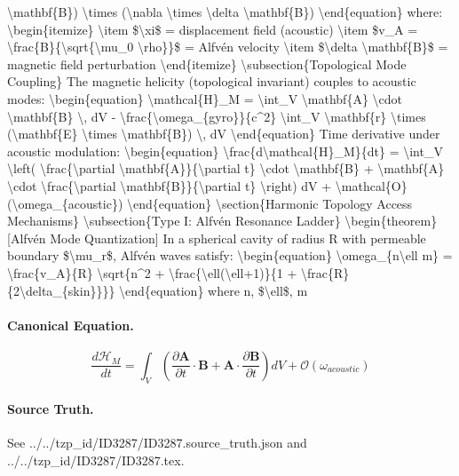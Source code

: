 \textbackslash{}mathbf\{B\}) \textbackslash{}times (\textbackslash{}nabla \textbackslash{}times \textbackslash{}delta \textbackslash{}mathbf\{B\}) \textbackslash{}end\{equation\} where: \textbackslash{}begin\{itemize\} \textbackslash{}item \$\textbackslash{}xi\$ = displacement field (acoustic) \textbackslash{}item \$v\_A = \textbackslash{}frac\{B\}\{\textbackslash{}sqrt\{\textbackslash{}mu\_0 \textbackslash{}rho\}\}\$ = Alfvén velocity \textbackslash{}item \$\textbackslash{}delta \textbackslash{}mathbf\{B\}\$ = magnetic field perturbation \textbackslash{}end\{itemize\} \textbackslash{}subsection\{Topological Mode Coupling\} The magnetic helicity (topological invariant) couples to acoustic modes: \textbackslash{}begin\{equation\} \textbackslash{}mathcal\{H\}\_M = \textbackslash{}int\_V \textbackslash{}mathbf\{A\} \textbackslash{}cdot \textbackslash{}mathbf\{B\} \textbackslash{}, dV - \textbackslash{}frac\{\textbackslash{}omega\_\{gyro\}\}\{c\textasciicircum{}2\} \textbackslash{}int\_V \textbackslash{}mathbf\{r\} \textbackslash{}times (\textbackslash{}mathbf\{E\} \textbackslash{}times \textbackslash{}mathbf\{B\}) \textbackslash{}, dV \textbackslash{}end\{equation\} Time derivative under acoustic modulation: \textbackslash{}begin\{equation\} \textbackslash{}frac\{d\textbackslash{}mathcal\{H\}\_M\}\{dt\} = \textbackslash{}int\_V \textbackslash{}left( \textbackslash{}frac\{\textbackslash{}partial \textbackslash{}mathbf\{A\}\}\{\textbackslash{}partial t\} \textbackslash{}cdot \textbackslash{}mathbf\{B\} + \textbackslash{}mathbf\{A\} \textbackslash{}cdot \textbackslash{}frac\{\textbackslash{}partial \textbackslash{}mathbf\{B\}\}\{\textbackslash{}partial t\} \textbackslash{}right) dV + \textbackslash{}mathcal\{O\}(\textbackslash{}omega\_\{acoustic\}) \textbackslash{}end\{equation\} \textbackslash{}section\{Harmonic Topology Access Mechanisms\} \textbackslash{}subsection\{Type I: Alfvén Resonance Ladder\} \textbackslash{}begin\{theorem\}[Alfvén Mode Quantization] In a spherical cavity of radius R with permeable boundary \$\textbackslash{}mu\_r\$, Alfvén waves satisfy: \textbackslash{}begin\{equation\} \textbackslash{}omega\_\{n\textbackslash{}ell m\} = \textbackslash{}frac\{v\_A\}\{R\} \textbackslash{}sqrt\{n\textasciicircum{}2 + \textbackslash{}frac\{\textbackslash{}ell(\textbackslash{}ell+1)\}\{1 + \textbackslash{}frac\{R\}\{2\textbackslash{}delta\_\{skin\}\}\}\} \textbackslash{}end\{equation\} where n, \$\textbackslash{}ell\$, m

\paragraph{Canonical Equation.}
\[
\begin{equation} \frac{d \mathcal{H}_M}{dt} = \int_V \left( \frac{ \partial \mathbf{A}}{ \partial t} \cdot \mathbf{B} + \mathbf{A} \cdot \frac{ \partial \mathbf{B}}{ \partial t} \right) dV + \mathcal{O}( \omega_{acoustic}) \end{equation}
\]

\paragraph{Source Truth.}
See ../../tzp\_id/ID3287/ID3287.source\_truth.json and ../../tzp\_id/ID3287/ID3287.tex.
